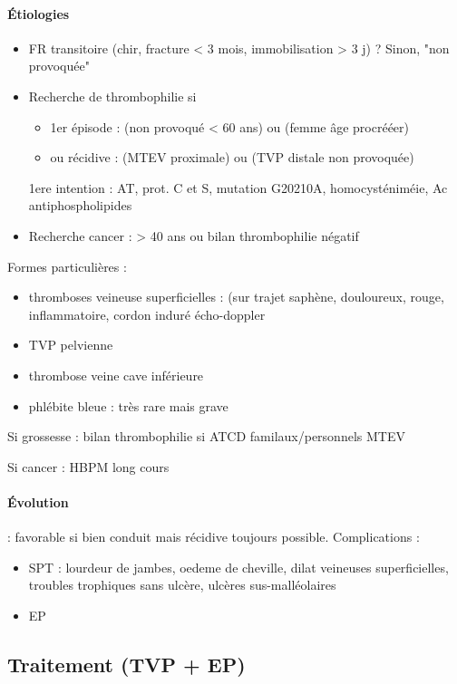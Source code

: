 \paragraph{Étiologies}
\begin{itemize}
  \item FR transitoire (chir, fracture < 3 mois, immobilisation > 3 j) ? Sinon, "non
provoquée"
\item Recherche de thrombophilie si
  \begin{itemize}
  \item 1er épisode :  (non provoqué < 60 ans) ou (femme âge procrééer)
  \item ou récidive : (MTEV proximale) ou (TVP distale non provoquée)
  \end{itemize}
  \thus 1ere intention : \gls{AT}, prot. C et S, mutation G20210A,
  homocysténiméie, Ac antiphospholipides
\item Recherche cancer : > 40 ans ou bilan thrombophilie négatif
\end{itemize}

Formes particulières :
\begin{itemize}
  \item thromboses veineuse superficielles : (sur trajet saphène, douloureux,
    rouge, inflammatoire, cordon induré \thus écho-doppler
  \item TVP pelvienne
  \item thrombose veine cave inférieure
  \item phlébite bleue : très rare mais grave
\end{itemize}

Si grossesse : bilan thrombophilie si ATCD familaux/personnels MTEV

Si cancer : HBPM long cours

\paragraph{Évolution} : favorable si bien conduit mais récidive toujours
possible. Complications : 
\begin{itemize}
  \item SPT : lourdeur de jambes, oedeme de cheville, dilat veineuses
    superficielles, troubles trophiques sans ulcère, ulcères sus-malléolaires
  \item EP
\end{itemize}



\subsection{Traitement (TVP + EP)}
